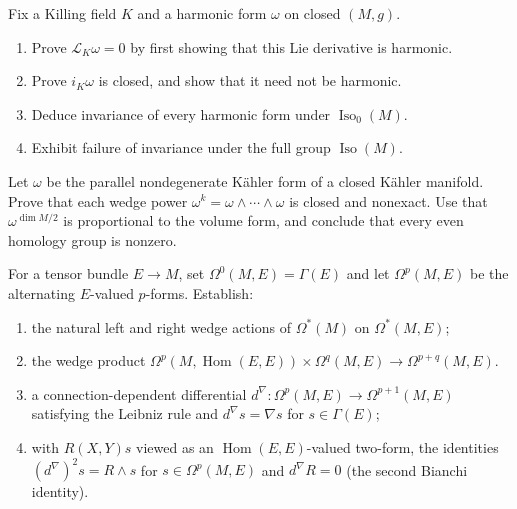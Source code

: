 \begin{remark}
  \label{rem:pet-ch9-exercise-9-6-14}

  Fix a Killing field $K$ and a harmonic form $\omega$ on closed $(M,g)$.
  \begin{enumerate}
    \item[(1)] Prove $\mathcal L_K\omega=0$ by first showing that this Lie
      derivative is harmonic.
    \item[(2)] Prove $i_K\omega$ is closed, and show that it need not be
      harmonic.
    \item[(3)] Deduce invariance of every harmonic form under
      $\operatorname{Iso}_0(M)$.
    \item[(4)] Exhibit failure of invariance under the full group
      $\operatorname{Iso}(M)$.
  \end{enumerate}
\end{remark}

\begin{remark}
  \label{rem:pet-ch9-exercise-9-6-15}

  Let $\omega$ be the parallel nondegenerate K\"ahler form of a closed
  K\"ahler manifold.  Prove that each wedge power
  $\omega^k=\omega\wedge\cdots\wedge\omega$ is closed and nonexact.  Use that
  $\omega^{\dim M/2}$ is proportional to the volume form, and conclude that
  every even homology group is nonzero.
\end{remark}

\begin{remark}
  \label{rem:pet-ch9-exercise-9-6-16}

  For a tensor bundle $E\to M$, set $\Omega^0(M,E)=\Gamma(E)$ and let
  $\Omega^p(M,E)$ be the alternating $E$-valued $p$-forms.  Establish:
  \begin{enumerate}
    \item[(1)] the natural left and right wedge actions of $\Omega^*(M)$ on
      $\Omega^*(M,E)$;
    \item[(2)] the wedge product
      $\Omega^p(M,\operatorname{Hom}(E,E))\times\Omega^q(M,E)\to\Omega^{p+q}(M,E)$.
    \item[(3)] a connection-dependent differential
      $d^\nabla:\Omega^p(M,E)\to\Omega^{p+1}(M,E)$ satisfying the Leibniz
      rule and $d^\nabla s=\nabla s$ for $s\in\Gamma(E)$;
    \item[(4)] with $R(X,Y)s$ viewed as an
      $\operatorname{Hom}(E,E)$-valued two-form, the identities
      $(d^\nabla)^2s=R\wedge s$ for $s\in\Omega^p(M,E)$ and
      $d^\nabla R=0$ (the second Bianchi identity).
  \end{enumerate}
\end{remark}

